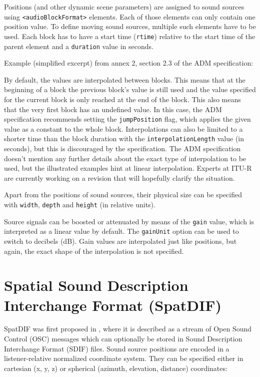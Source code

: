 Positions (and other dynamic scene parameters)
are assigned to sound sources using \texttt{<audioBlockFormat>} elements.
Each of those elements can only contain one position value.
To define moving sound sources, multiple such elements have to be used.
Each block has to have a start time (\texttt{rtime})
relative to the start time of the parent element
and a \texttt{duration} value in seconds.

Example (simplified excerpt) from annex 2,
section 2.3 of the ADM specification:


\noindent
By default,
the values are interpolated between blocks.
This means that at the beginning of a block
the previous block's value is still used
and the value specified for the current block
is only reached at the end of the block.
This also means that the very first block
has an undefined value.
In this case, the ADM specification recommends
setting the \texttt{jumpPosition} flag,
which applies the given value as a constant to the whole block.
Interpolations can also be limited to a shorter time than the block duration
with the \texttt{interpolationLength} value (in seconds),
but this is discouraged by the specification.
The ADM specification doesn't mention any further details
about the exact type of interpolation to be used,
but the illustrated examples hint at linear interpolation.
Experts at ITU-R are currently working on a revision
that will hopefully clarify the situation.

Apart from the positions of sound sources,
their physical size can be specified with
\texttt{width},
\texttt{depth} and
\texttt{height} (in relative units).

Source signals can be boosted or attenuated by means of the
\texttt{gain} value, which is interpreted as a linear value by default.
The \texttt{gainUnit} option can be used to switch to decibels (dB).
Gain values are interpolated just like positions,
but again, the exact shape of the interpolation is not specified.


\section{Spatial Sound Description Interchange Format (SpatDIF)}
\label{sec:SpatDIF}

SpatDIF was first proposed in
\parencite{peters2007spatdif},
where it is described as a stream of
Open Sound Control (OSC)
messages which can optionally be stored in
Sound Description Interchange Format (SDIF)
files.
Sound source positions are encoded in a
listener-relative normalized coordinate system.
They can be specified either in cartesian (x, y, z)
or spherical (azimuth, elevation, distance) coordinates:


